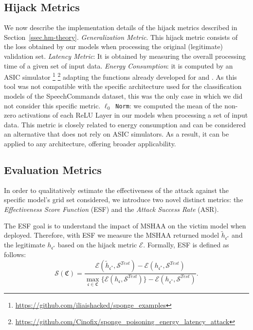 \subsection{Hijack Metrics}
We now describe the implementation details of the hijack metrics described in Section~\ref{ssec.hm-theory}. \textit{Generalization Metric}. This hijack metric consists of the loss obtained by our models when processing the original (legitimate) validation set. 
\textit{Latency Metric}: It is obtained by measuring the overall processing time of a given set of input data.
\textit{Energy Consumption}: it is computed by an ASIC simulator \footnote{\url{https://github.com/iliaishacked/sponge_examples}} \footnote{\url{https://github.com/Cinofix/sponge_poisoning_energy_latency_attack}} adapting the functions already developed for \cite{shumailov2021sponge} and \cite{cina2022energy}. As this tool was not compatible with the specific architecture used for the classification models of the SpeechCommands dataset, this was the only case in which we did not consider this specific metric.
\texttt{$\ell_0$ Norm}: we computed the mean of the non-zero activations of each ReLU Layer in our models when processing a set of input data. 
This metric is closely related to energy consumption and can be considered an alternative that does not rely on ASIC simulators. As a result, it can be applied to any architecture, offering broader applicability.

\subsection{Evaluation Metrics}
In order to qualitatively estimate the effectiveness of the
attack against the specific model’s grid set considered, we
introduce two novel distinct metrics: the \textit{Effectiveness Score Function} (ESF) and the \textit{Attack Success Rate} (ASR).
\par
The ESF goal is to understand the impact of MSHAA on the victim model when deployed. Therefore, with ESF we measure the MSHAA returned model $\tilde{h}_{\mathfrak{c}^*}$ and the legitimate $h_{\mathfrak{c}^*}$ based on the hijack metric $\mathcal{E}$.
Formally, ESF is defined as follows:
\begin{equation}
     \mathscr{S}(\mathfrak{C}) = \frac{
         \mathcal{E} ( \tilde{h}_{\mathfrak{c}^*}, \mathcal{S}^{Test} ) 
         - 
         \mathcal{E} ( h_{\mathfrak{c}^*}, \mathcal{S}^{Test} )
     }
     {
         \underset{\mathfrak{c} \in \mathfrak{C}}{\max} \{\mathcal{E}(h_{\mathfrak{c}}, \mathcal{S}^{Test})\} - 
         \mathcal{E} (    h_{\mathfrak{c}^*}, \mathcal{S}^{Test}    )
     }.
\end{equation}


